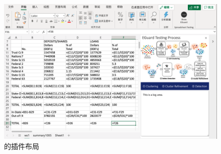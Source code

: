 \begin{figure}[tbp]    
    \centering
    \includegraphics[width=\textwidth]{figure/eg/eguard-1.png}
    \caption{\eg 的插件布局}
    \label{figure-eg1}
\end{figure}